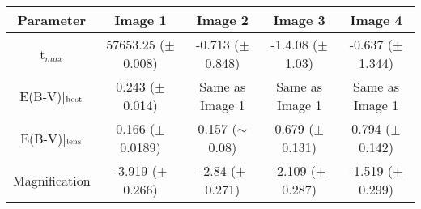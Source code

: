 \begin{table*}
\centering
\begin{tabular}{|c|c|c|c|c|}
\hline
Parameter & Image 1 & Image 2 &  Image 3 & Image 4 \\
\hline\hline
t$_{max}$ &  57653.25 ($\pm$ 0.008) & -0.713 ($\pm$  0.848) & -1.4.08  ($\pm$ 1.03) & -0.637 ($\pm$ 1.344) \\
E(B-V)|$_{\rm host}$ & 0.243 ($\pm$ 0.014) & Same as Image 1 & Same as Image 1 & Same as Image 1  \\
E(B-V)|$_{\rm lens}$ &  0.166 ($\pm$ 0.0189) &  0.157 ($\sim$ 0.08) & 0.679 ($\pm$ 0.131) & 0.794 ($\pm$ 0.142) \\
Magnification & -3.919 ($\pm$ 0.266) & -2.84 ($\pm$ 0.271) &  -2.109 ($\pm$ 0.287) & -1.519 ($\pm$ 0.299) 
\\

\hline
\end{tabular}
\label{tab:params}
\end{table*}